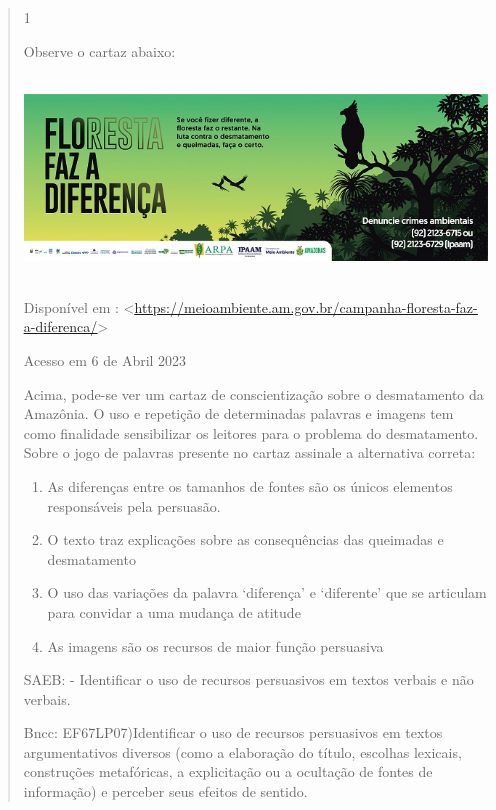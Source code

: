 {\begin{quote}
{\begin{itemize}
\begin{itemize}
\num{1}

Observe o cartaz abaixo:

\includegraphics[width=5.90551in,height=2.125in]{./imgSAEB_7_POR/media/image16.png}

Disponível em :
\textless{}\href{https://meioambiente.am.gov.br/campanha-floresta-faz-a-diferenca/}{\uline{https://meioambiente.am.gov.br/campanha-floresta-faz-a-diferenca/}}\textgreater{}

Acesso em 6 de Abril 2023

Acima, pode-se ver um cartaz de conscientização sobre o desmatamento da
Amazônia. O uso e repetição de determinadas palavras e imagens tem como
finalidade sensibilizar os leitores para o problema do desmatamento.
Sobre o jogo de palavras presente no cartaz assinale a alternativa
correta:

\begin{enumerate}

\item
  As diferenças entre os tamanhos de fontes são os únicos elementos
  responsáveis pela persuasão.
\item
  O texto traz explicações sobre as consequências das queimadas e
  desmatamento
\item
  O uso das variações da palavra `diferença' e `diferente' que se
  articulam para convidar a uma mudança de atitude
\item
  As imagens são os recursos de maior função persuasiva
\end{enumerate}

SAEB: - Identificar o uso de recursos persuasivos em textos verbais e
não verbais.

Bncc: EF67LP07)Identificar o uso de recursos persuasivos em textos
argumentativos diversos (como a elaboração do título, escolhas lexicais,
construções metafóricas, a explicitação ou a ocultação de fontes de
informação) e perceber seus efeitos de sentido.


\end{itemize}
\end{itemize}}
\end{quote}}
